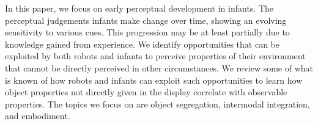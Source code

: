 In this paper, we focus on early perceptual development in infants.  The
perceptual judgements infants make change over time, showing
an evolving sensitivity to various cues. This progression
may be at least partially due to knowledge gained
from experience.
%
%
%
%
We identify opportunities that can be exploited by both robots and
infants to perceive properties of their environment that cannot be
directly perceived in other circumstances.  
%
%
%
We review some of what is known of how robots and infants can exploit
such opportunities to learn how object properties not directly given
in the display correlate with observable properties.
%
%
%
The topics we focus on are object segregation,
intermodal integration, and embodiment.









